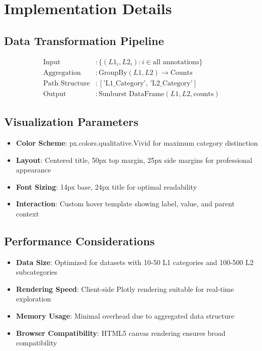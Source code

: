 \documentclass[11pt]{article}
\begin{document}
\section{Implementation Details}

\subsection{Data Transformation Pipeline}
\begin{align}
\text{Input} &: \{(L1_i, L2_i) : i \in \text{all annotations}\} \\
\text{Aggregation} &: \text{GroupBy}(L1, L2) \rightarrow \text{Counts} \\
\text{Path Structure} &: [\text{'L1\_Category', 'L2\_Category'}] \\
\text{Output} &: \text{Sunburst DataFrame}(L1, L2, \text{counts})
\end{align}

\subsection{Visualization Parameters}
\begin{itemize}
\item \textbf{Color Scheme}: px.colors.qualitative.Vivid for maximum category distinction
\item \textbf{Layout}: Centered title, 50px top margin, 25px side margins for professional appearance
\item \textbf{Font Sizing}: 14px base, 24px title for optimal readability
\item \textbf{Interaction}: Custom hover template showing label, value, and parent context
\end{itemize}

\subsection{Performance Considerations}
\begin{itemize}
\item \textbf{Data Size}: Optimized for datasets with 10-50 L1 categories and 100-500 L2 subcategories
\item \textbf{Rendering Speed}: Client-side Plotly rendering suitable for real-time exploration
\item \textbf{Memory Usage}: Minimal overhead due to aggregated data structure
\item \textbf{Browser Compatibility}: HTML5 canvas rendering ensures broad compatibility
\end{itemize}
\end{document}
